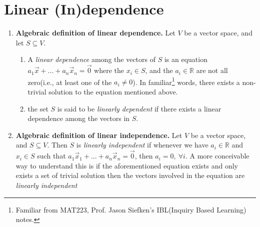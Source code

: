 \documentclass[12pt]{book}
\newcommand{\settag}[1]{\renewcommand{\theenumi}{#1}}
\newcommand{\R}{\mathbb{R}}
\begin{document}
\section{Linear (In)dependence}
    \begin{enumerate}
        \settag{1.4.2}
        \item \textbf{Algebraic definition of linear dependence.} Let $V$ be a vector space, and let $S\subseteq V$.
            \begin{enumerate}
                \item A \textit{linear dependence} among the vectors of $S$ is an equation $a_1\vec{x} + ... + a_n\vec{x}_n = \vec{0}$ where the $x_i\in S$, and the $a_i\in \R$ are not all zero(i.e., at least one of the $a_i\neq 0$). In familiar\footnote{Familiar from MAT223, Prof. Jason Siefken's IBL(Inquiry Based Learning) notes.} words, there exists a non-trivial solution to the equation mentioned above.
                \item the set $S$ is said to be \textit{linearly dependent} if there exists a linear dependence among the vectors in $S$.
            \end{enumerate}
        
        
        \settag{1.4.4}
        \item \textbf{Algebraic definition of linear independence.} Let $V$ be a vector space, and $S\subseteq V$. Then $S$ is \textit{linearly independent} if whenever we have $a_i\in \R$ and $x_i\in S$ such that $a_1\vec{x}_1+...+a_n\vec{x}_n = \vec{0}$, then $a_i = 0,~\forall i$. A more conceivable way to understand this is if the aforementioned equation exists and only exists a set of trivial solution then the vectors involved in the equation are \textit{linearly independent}
        

\end{enumerate}
\end{document}

